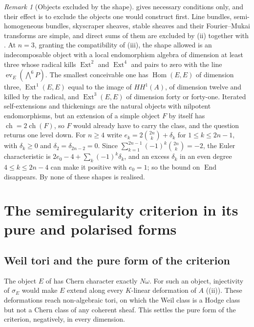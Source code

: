 \documentclass[11pt,reqno]{amsart}
\theoremstyle{plain}
\theoremstyle{definition}
\theoremstyle{remark}
\newtheorem{remark}[theorem]{Remark}
\DeclareMathOperator{\ch}{ch}
\DeclareMathOperator{\End}{End}
\DeclareMathOperator{\Hom}{Hom}
\DeclareMathOperator{\Ext}{Ext}
\begin{document}
\begin{remark}[Objects excluded by the shape]\label{rem:p2endo}
 gives necessary conditions only, and their effect is to
exclude the objects one would construct first. Line bundles, semi-homogeneous
bundles, skyscraper sheaves, stable sheaves and their Fourier--Mukai
transforms are simple, and direct sums of them are excluded by (ii) together
with \cite[Theorem~2.32]{paperIII}. At $n=3$, granting the compatibility of
(iii), the shape allowed is an indecomposable object
with a local endomorphism algebra of dimension at least three whose radical
kills $\Ext^{2}$ and $\Ext^{4}$ and pairs to zero with the line
$\operatorname{ev}_{E}(\bigwedge^{6}P)$. The smallest conceivable one has
$\Hom(E,E)$ of dimension three, $\Ext^{1}(E,E)$ equal to the image of
$HH^{1}(A)$, of dimension twelve and killed by the radical, and
$\Ext^{3}(E,E)$ of dimension forty or forty-one. Iterated self-extensions and
thickenings are the natural objects with nilpotent endomorphisms, but an
extension of a simple object $F$ by itself has $\ch=2\ch(F)$, so $F$ would
already have to carry the class, and the question returns one level down.
For $n\ge4$ write $e_{k}=2\binom{2n}{k}+\delta_{k}$ for $1\le k\le2n-1$,
with $\delta_{k}\ge0$ and $\delta_{2}=\delta_{2n-2}=0$. Since
$\sum_{k=1}^{2n-1}(-1)^{k}\binom{2n}{k}=-2$, the Euler characteristic is
$2e_{0}-4+\sum_{k}(-1)^{k}\delta_{k}$, and an excess $\delta_{k}$ in an even
degree $4\le k\le2n-4$ can make it positive with $e_{0}=1$; so the bound on
$\End$ disappears. By
 none of these shapes is realised.
\end{remark}
\section{The semiregularity criterion in its pure and polarised forms}\label{sec:polarised}

\subsection{Weil tori and the pure form of the criterion}

The object $E$ of \cite[Section~16]{paperI} has Chern character exactly
$N\omega$. For such an object, injectivity of $\sigma_{E}$ would make $E$
extend along every $K$-linear deformation of $A$ ((ii)). These
deformations reach non-algebraic tori, on which the Weil class is a Hodge
class but not a Chern class of any coherent sheaf. This settles the pure form
of the criterion, negatively, in every dimension.
\end{document}
